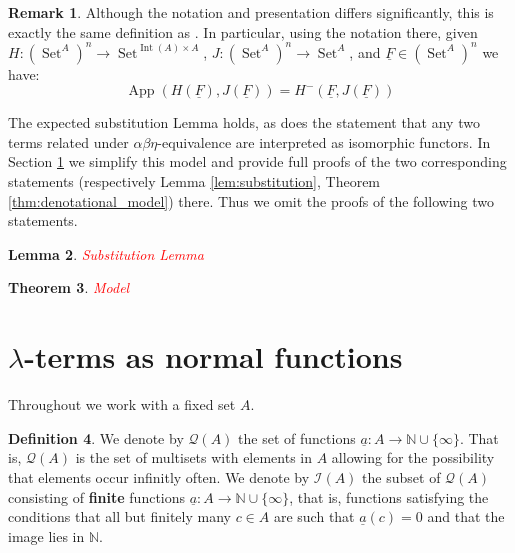 \documentclass[12pt]{article}
\theoremstyle{plain}
\newtheorem{thm}{Theorem}[subsection] %
\newtheorem{lemma}[thm]{Lemma}
\theoremstyle{definition}
\newtheorem{defn}[thm]{Definition} %
\newtheorem{remark}[thm]{Remark}
\newcommand{\bb}[1]{\mathbb{#1}}
\newcommand{\call}[1]{\mathcal{#1}}
\newcommand{\Ical}{\call{I}}
\newcommand{\Qcal}{\call{Q}}
\newcommand{\lto}{\longrightarrow}
\DeclareMathOperator{\set}{Set}
\begin{document}
\begin{remark}
    Although the notation and presentation differs significantly, this is exactly the same definition as \cite[The model $A_\infty$]{Girard}. In particular, using the notation there, given $H: (\set^A)^n \lto \set^{\operatorname{Int}(A) \times A}$, $J: (\set^A)^n \lto \set^A$, and $\underline{F} \in (\set^A)^n$ we have:
    \begin{equation}
        \operatorname{App}(H(\underline{F}), J(\underline{F})) = H^-(\underline{F}, J(\underline{F}))
    \end{equation}
\end{remark}

The expected substitution Lemma holds, as does the statement that any two terms related under $\alpha\beta\eta$-equivalence are interpreted as isomorphic functors. In Section \ref{sec:new_model} we simplify this model and provide full proofs of the two corresponding statements (respectively Lemma \ref{lem:substitution}, Theorem \ref{thm:denotational_model}) there. Thus we omit the proofs of the following two statements.

\begin{lemma}
    \textcolor{red}{Substitution Lemma}
\end{lemma}

\begin{thm}
    \textcolor{red}{Model}
\end{thm}
	
\section{$\lambda$-terms as normal functions}\label{sec:new_model}
Throughout we work with a fixed set $A$.
	
	\begin{defn}
		We denote by $\Qcal(A)$ the set of functions $\underline{a}: A \lto \bb{N} \cup \{ \infty \}$. That is, $\Qcal(A)$ is the set of multisets with elements in $A$ allowing for the possibility that elements occur infinitly often. We denote by $\Ical(A)$ the subset of $\Qcal(A)$ consisting of \textbf{finite} functions $\underline{a}: A \lto \bb{N} \cup \{ \infty \}$, that is, functions satisfying the conditions that all but finitely many $c \in A$ are such that $\underline{a}(c) = 0$ and that the image lies in $\bb{N}$.
	\end{defn}
	
\end{document}
